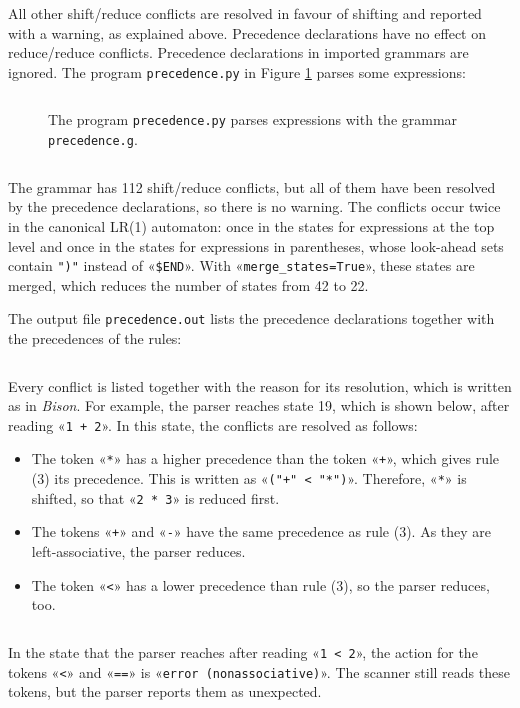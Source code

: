 \documentclass[11pt,a4paper]{article}
\newenvironment{unbreakable}{\par\noindent\begin{minipage}{\linewidth}}{\end{minipage}\par}
\newcommand{\codefigure}[5][]{\begin{figure}[H]%
  \inputminted[numbers = left, numbersep = 0.3cm, #1]{#2}{examples/#3}%
  \vspace*{-0.3cm}%
  \caption{#5}\label{#4}\end{figure}}
\newcommand{\pythonfile}[2]{\codefigure{python3}{#1}{fig:#1}{#2}}
\newcommand{\resultfile}[2][\normalsize]{\begin{unbreakable}%
  \inputminted[fontsize = #1, breaklines]{text}{examples/output/#2.txt}\end{unbreakable}}
\begin{document}
All other shift/reduce conflicts are resolved in favour of shifting and reported with a warning, as
explained above.  Precedence declarations have no effect on reduce/reduce conflicts.  Precedence
declarations in imported grammars are ignored.  The program \texttt{precedence.py} in Figure
\ref{fig:precedence.py} parses some expressions:
\pythonfile{precedence.py}{The program \texttt{precedence.py} parses expressions with the grammar
  \texttt{precedence.g}.}
\resultfile[\small]{precedence}
The grammar has 112 shift/reduce conflicts, but all of them have been resolved by the precedence
declarations, so there is no warning.  The conflicts occur twice in the canonical LR(1) automaton:  once in
the states for expressions at the top level and once in the states for expressions in parentheses, whose
look-ahead sets contain \verb|")"| instead of «\verb|$END|».  With «\verb|merge_states=True|», these states
are merged, which reduces the number of states from 42 to 22.

The output file \texttt{precedence.out} lists the precedence declarations together with the precedences of
the rules:
\resultfile[\small]{precedence-section}
Every conflict is listed together with the reason for its resolution, which is written as in \textsl{Bison}.
For example, the parser reaches state 19, which is shown below, after reading «\verb|1 + 2|».  In this state,
the conflicts are resolved as follows:
\begin{itemize}
\item The token «\verb|*|» has a higher precedence than the token «\verb|+|», which gives rule (3) its
      precedence.  This is written as «\verb|("+" < "*")|».  Therefore, «\verb|*|» is shifted, so that
      «\verb|2 * 3|» is reduced first.
\item The tokens «\verb|+|» and «\verb|-|» have the same precedence as rule (3).  As they are left-associative,
      the parser reduces.
\item The token «\verb|<|» has a lower precedence than rule (3), so the parser reduces, too.
\end{itemize}
\resultfile[\small]{precedence-state}
In the state that the parser reaches after reading «\verb|1 < 2|», the action for the tokens «\verb|<|» and
«\verb|==|» is «\verb|error (nonassociative)|».  The scanner still reads these tokens, but the parser reports
them as unexpected.
\end{document}
